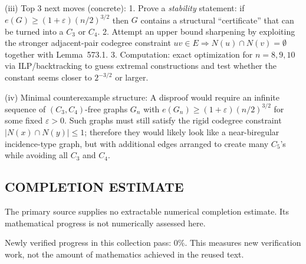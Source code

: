 (iii) Top 3 next moves (concrete):
1. Prove a \emph{stability} statement: if $e(G)\ge (1+\varepsilon)(n/2)^{3/2}$ then $G$ contains a structural ``certificate'' that can be turned into a $C_3$ or $C_4$.
2. Attempt an upper bound sharpening by exploiting the stronger adjacent-pair codegree constraint $uv\in E\Rightarrow N(u)\cap N(v)=\emptyset$ together with Lemma~573.1.
3. Computation: exact optimization for $n=8,9,10$ via ILP/backtracking to guess extremal constructions and test whether the constant seems closer to $2^{-3/2}$ or larger.

(iv) Minimal counterexample structure:  
A disproof would require an infinite sequence of $(C_3,C_4)$-free graphs $G_n$ with
$e(G_n)\ge (1+\varepsilon)(n/2)^{3/2}$ for some fixed $\varepsilon>0$.
Such graphs must still satisfy the rigid codegree constraint $|N(x)\cap N(y)|\le 1$; therefore they would likely look like a near-biregular incidence-type graph, but with additional edges arranged to create many $C_5$'s while avoiding all $C_3$ and $C_4$.




\subsection*{COMPLETION ESTIMATE}
The primary source supplies no extractable numerical completion estimate. Its mathematical progress is not numerically assessed here.

Newly verified progress in this collection pass: $0\%$. This measures new verification work, not the amount of mathematics achieved in the reused text.
